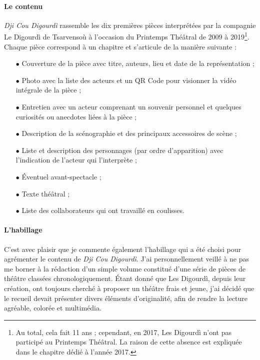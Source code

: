 \paragraph*{Le contenu}
\textit{Dji Cou Digourdì} rassemble les dix premières pièces interprétées par la compagnie Le Digourdì de Tsarvensoù à l'occasion du Printemps Thé\^atral de 2009 à 2019\footnote{ Au total, cela fait 11 ans ; cependant, en 2017, Les Digourdì n'ont pas participé au Printemps Thé\^atral. La raison de cette absence est expliquée dans le chapitre dédié à l'année 2017.}. Chaque pièce correspond à un chapitre et s'articule de la manière suivante :
\begin{itemize}
\item[$\bullet$] Couverture de la pièce avec titre, auteurs, lieu et date de la représentation ;
\item[$\bullet$] Photo avec la liste des acteurs et un QR Code pour visionner la vidéo intégrale de la pièce ;
\item[$\bullet$] Entretien avec un acteur comprenant un souvenir personnel et quel\-ques curiosités ou anecdotes liées à la pièce ;
\item[$\bullet$] Description de la scénographie et des principaux accessoires de scène ;
\item[$\bullet$] Liste et description des personnages (par ordre d'apparition) avec l'indication de l'acteur qui l'interprète ;
\item[$\bullet$] Éventuel avant-spectacle ;
\item[$\bullet$] Texte théâtral ;
\item[$\bullet$] Liste des collaborateurs qui ont travaillé en coulisses.
\end{itemize}

\paragraph*{L'habillage}
C'est avec plaisir que je commente également l'habillage qui a été choisi pour agrémenter le contenu de \textit{Dji Cou Digourdì}. J'ai personnellement veillé à ne pas me borner à la rédaction d'un simple volume constitué d'une série de pièces de théâtre classées chronologiquement. Étant donné que Les Digourdì, depuis leur création, ont toujours cherché à proposer un théâtre frais et jeune, j'ai décidé que le recueil devait présenter divers éléments d'originalité, afin de rendre la lecture agréable, colorée et multimédia.

